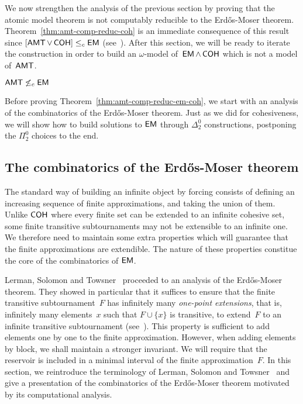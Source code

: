 
We now strengthen the analysis of the previous section by
proving that the atomic model theorem is not computably reducible to the Erd\H{o}s-Moser theorem.
Theorem~\ref{thm:amt-comp-reduc-coh} is an immediate consequence of this result since
$[\operatorname{\sf{AMT}} \vee \operatorname{\sf{COH}}] \leq_c \operatorname{\sf{EM}}$ (see~\cite{Patey2015Somewhere}).
After this section, we will be ready to iterate the construction
in order to build an $\omega$-model of~$\operatorname{\sf{EM}} \wedge \operatorname{\sf{COH}}$ which is not a model of~$\operatorname{\sf{AMT}}$.

\begin{theorem}\label{thm:amt-comp-reduc-em-coh}
$\operatorname{\sf{AMT}} \not \leq_c \operatorname{\sf{EM}}$
\end{theorem}

Before proving Theorem~\ref{thm:amt-comp-reduc-em-coh},
we start with an analysis of the combinatorics of the Erd\H{o}s-Moser theorem.
Just as we did for cohesiveness, we will show how to build solutions to $\operatorname{\sf{EM}}$ through $\Delta^0_2$ constructions, 
postponing the $\Pi^0_2$ choices to the end.

\subsection{The combinatorics of the Erd\H{o}s-Moser theorem}\label{subsect:combi-em}

The standard way of building an infinite object by forcing consists of defining an increasing
sequence of finite approximations, and taking the union of them. Unlike
$\operatorname{\sf{COH}}$ where every finite set can be extended to an infinite cohesive set,
some finite transitive subtournaments may not be extensible to an infinite one.
We therefore need to maintain some extra properties which will guarantee that
the finite approximations are extendible.
The nature of these properties constitue the core of the combinatorics of $\operatorname{\sf{EM}}$.

Lerman, Solomon and Towsner~\cite{Lerman2013Separating} proceeded to an analysis
of the Erd\H{o}s-Moser theorem.
They showed in particular that it suffices to ensure that the finite transitive subtournament~$F$
has infinitely many \emph{one-point extensions}, that is, infinitely many elements~$x$ such that
$F \cup \{x\}$ is transitive, to extend~$F$ to an infinite transitive subtournament (see~\cite[Lemma 3.4]{Lerman2013Separating}).
This property is sufficient to add elements one by one to the finite approximation.
However, when adding elements by block, we shall maintain a stronger invariant. We will require that
the reservoir is included in a minimal interval of the finite approximation~$F$.
In this section, we reintroduce the terminology of Lerman, Solomon and Towsner~\cite{Lerman2013Separating}
and give a presentation of the combinatorics of the Erd\H{o}s-Moser theorem
motivated by its computational analysis.

